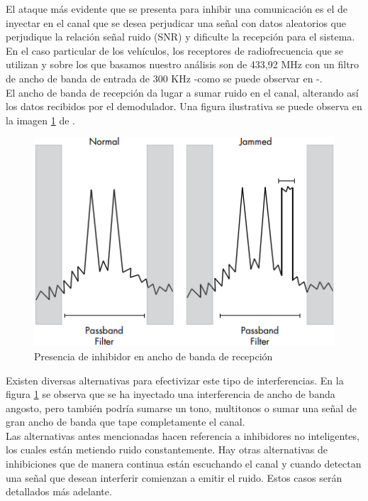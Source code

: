 \documentclass[12pt]{report}
\begin{document}
El ataque más evidente que se presenta para inhibir una comunicación es el de inyectar en el canal que se desea perjudicar una señal con 
datos aleatorios que perjudique la relación señal ruido (SNR) y dificulte la recepción para el sistema. \\
En el caso particular de los vehículos, los receptores de radiofrecuencia que se utilizan y sobre los que basamos nuestro análisis
son de 433,92 MHz con un filtro de ancho de banda de entrada de 300 KHz -como se puede observar en -.\\
El ancho de banda de recepción da lugar a sumar ruido en el canal, alterando así los datos recibidos por el demodulador. Una figura
ilustrativa se puede observa en la imagen \ref{fpb_jam} de .

\begin{figure}[htb]
	\centering
	\includegraphics[scale=0.8]{fpb_jam.png}
	\caption{Presencia de inhibidor en ancho de banda de recepción}
	\label{fpb_jam}
\end{figure}

Existen diversas alternativas para efectivizar este tipo de interferencias. En la figura \ref{fpb_jam} se observa que se ha inyectado una
interferencia de ancho de banda angosto, pero también podría sumarse un tono, multitonos o sumar una señal de gran ancho de banda que 
tape completamente el canal. \\
Las alternativas antes mencionadas hacen referencia a inhibidores no inteligentes, los cuales están metiendo ruido constantemente. Hay otras 
alternativas de inhibiciones que de manera continua están escuchando el canal y cuando detectan una señal que 
desean interferir comienzan a emitir el ruido. Estos casos serán detallados más adelante.
\end{document}
